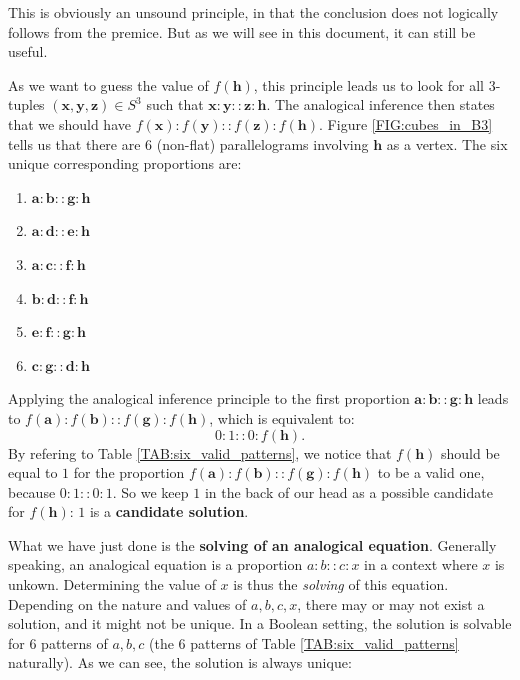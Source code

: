 This is obviously an unsound principle, in that the conclusion does not
logically follows from the premice. But as we will see in this document, it can
still be useful. 

As we want to guess the value of $f(\mathbf{h})$, this principle leads us to
look for all 3-tuples $(\mathbf{x}, \mathbf{y}, \mathbf{z}) \in S^3$ such that
$\mathbf{x}:\mathbf{y}::\mathbf{z}:\mathbf{h}$.  The analogical inference then
states that we should have
$f(\mathbf{x}):f(\mathbf{y})::f(\mathbf{z}):f(\mathbf{h})$. Figure
\ref{FIG:cubes_in_B3} tells us that there are 6 (non-flat) parallelograms
involving $\mathbf{h}$ as a vertex. The six unique corresponding proportions
are:

\begin{enumerate}
  \item $\mathbf{a} : \mathbf{b} :: \mathbf{g} : \mathbf{h}$
  \item $\mathbf{a} : \mathbf{d} :: \mathbf{e} : \mathbf{h}$
  \item $\mathbf{a} : \mathbf{c} :: \mathbf{f} : \mathbf{h}$
  \item $\mathbf{b} : \mathbf{d} :: \mathbf{f} : \mathbf{h}$
  \item $\mathbf{e} : \mathbf{f} :: \mathbf{g} : \mathbf{h}$
  \item $\mathbf{c} : \mathbf{g} :: \mathbf{d} : \mathbf{h}$
\end{enumerate}

Applying the analogical inference principle to the first proportion $\mathbf{a}
: \mathbf{b} :: \mathbf{g} : \mathbf{h}$ leads to $f(\mathbf{a}) :
f(\mathbf{b}) :: f(\mathbf{g}) : f(\mathbf{h})$, which is equivalent to:
$$0:1::0:f(\mathbf{h}).$$ By refering to Table \ref{TAB:six_valid_patterns}, we
notice that $f(\mathbf{h})$ should be equal to $1$ for the proportion
$f(\mathbf{a}) : f(\mathbf{b}) :: f(\mathbf{g}) : f(\mathbf{h})$ to be a valid
one, because $0:1::0:1$. So we keep $1$ in the back of our head as a possible
candidate for $f(\mathbf{h})$: $1$ is a \textbf{candidate solution}.

What we have just done is the \textbf{solving of an analogical equation}.
Generally speaking, an analogical equation is a proportion $a:b::c:x$ in a
context where $x$ is unkown. Determining the value of $x$ is thus the
\textit{solving} of this equation. Depending on the nature and values of $a, b,
c, x$, there may or may not exist a solution, and it might not be unique. In a
Boolean setting, the solution is solvable for 6 patterns of $a, b, c$ (the 6
patterns of Table \ref{TAB:six_valid_patterns} naturally). As we can see, the
solution is always unique:

